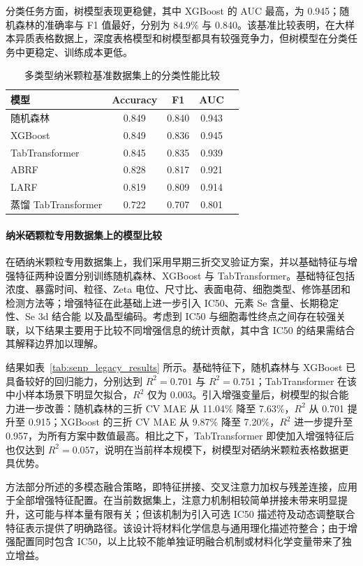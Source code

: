 \documentclass[letterpaper]{article}
\begin{document}
分类任务方面，树模型表现更稳健，其中 XGBoost 的 AUC 最高，为 0.945；随机森林的准确率与 F1 值最好，分别为 84.9\% 与 0.840。该基准比较表明，在大样本异质表格数据上，深度表格模型和树模型都具有较强竞争力，但树模型在分类任务中更稳定、训练成本更低。

\begin{table}[htbp]
  \centering
  \caption{多类型纳米颗粒基准数据集上的分类性能比较}
  \label{tab:benchmark_classification}
  \begin{tabular}{lcccc}
    \hline
    模型 & Accuracy & F1 & AUC \\
    \hline
    随机森林 & 0.849 & 0.840 & 0.943 \\
    XGBoost & 0.849 & 0.836 & 0.945 \\
    TabTransformer & 0.845 & 0.835 & 0.939 \\
    ABRF & 0.828 & 0.817 & 0.921 \\
    LARF & 0.819 & 0.809 & 0.914 \\
    蒸馏 TabTransformer & 0.722 & 0.707 & 0.801 \\
    \hline
  \end{tabular}
\end{table}

\paragraph{纳米硒颗粒专用数据集上的模型比较}
在硒纳米颗粒专用数据集上，我们采用早期三折交叉验证方案，并以基础特征与增强特征两种设置分别训练随机森林、XGBoost 与 TabTransformer。基础特征包括浓度、暴露时间、粒径、Zeta 电位、尺寸比、表面电荷、细胞类型、修饰基团和检测方法等；增强特征在此基础上进一步引入 IC50、元素 Se 含量、长期稳定性、Se 3d 结合能 以及晶型编码。考虑到 IC50 与细胞毒性终点之间存在较强关联，以下结果主要用于比较不同增强信息的统计贡献，其中含 IC50 的结果需结合其解释边界加以理解。

结果如表~\ref{tab:senp_legacy_results} 所示。基础特征下，随机森林与 XGBoost 已具备较好的回归能力，分别达到 $R^2=0.701$ 与 $R^2=0.751$；TabTransformer 在该中小样本场景下明显欠拟合，$R^2$ 仅为 0.003。引入增强变量后，树模型的拟合能力进一步改善：随机森林的三折 CV MAE 从 11.04\% 降至 7.63\%，$R^2$ 从 0.701 提升至 0.915；XGBoost 的三折 CV MAE 从 9.87\% 降至 7.20\%，$R^2$ 进一步提升至 0.957，为所有方案中数值最高。相比之下，TabTransformer 即使加入增强特征后也仅达到 $R^2=0.057$，说明在当前样本规模下，树模型对硒纳米颗粒表格数据更具优势。

方法部分所述的多模态融合策略，即特征拼接、交叉注意力加权与残差连接，应用于全部增强特征配置。在当前数据集上，注意力机制相较简单拼接未带来明显提升，这可能与样本量有限有关；但该机制为引入可选 IC50 描述符及动态调整联合特征表示提供了明确路径。该设计将材料化学信息与通用理化描述符整合；由于增强配置同时包含 IC50，以上比较不能单独证明融合机制或材料化学变量带来了独立增益。
\end{document}
